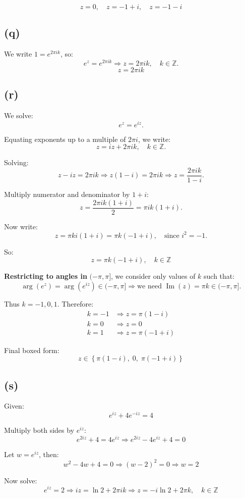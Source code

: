 \documentclass{article}
\begin{document}
\[
\boxed{z = 0,\quad z = -1 + i,\quad z = -1 - i}
\]
\subsection*{(q)}
We write \(1 = e^{2\pi i k}\), so:
\[
e^z = e^{2\pi i k} \Rightarrow z = 2\pi i k, \quad k \in \mathbb{Z}.
\]
\[
\boxed{z = 2\pi i k}
\]
\subsection*{(r)}
We solve:
\[
e^z = e^{iz}.
\]

Equating exponents up to a multiple of \(2\pi i\), we write:
\[
z = iz + 2\pi i k, \quad k \in \mathbb{Z}.
\]

Solving:
\[
z - iz = 2\pi i k
\Rightarrow z(1 - i) = 2\pi i k
\Rightarrow z = \frac{2\pi i k}{1 - i}.
\]

Multiply numerator and denominator by \(1 + i\):
\[
z = \frac{2\pi i k (1 + i)}{2} = \pi i k (1 + i).
\]

Now write:
\[
z = \pi k i (1 + i) = \pi k (-1 + i), \quad \text{since } i^2 = -1.
\]

So:
\[
\boxed{z = \pi k(-1 + i), \quad k \in \mathbb{Z}}
\]

\textbf{Restricting to angles in } \((- \pi, \pi]\), we consider only values of \(k\) such that:
\[
\arg(e^z) = \arg(e^{iz}) \in (-\pi, \pi]
\Rightarrow \text{we need } \operatorname{Im}(z) = \pi k \in (-\pi, \pi].
\]

Thus \(k = -1, 0, 1\). Therefore:
\[
\boxed{
\begin{aligned}
k = -1 &\Rightarrow z = \pi (1 - i) \\
k = 0 &\Rightarrow z = 0 \\
k = 1 &\Rightarrow z = \pi (-1 + i)
\end{aligned}
}
\]

Final boxed form:
\[
\boxed{
z \in \left\{ \pi(1 - i),\; 0,\; \pi(-1 + i) \right\}
}
\]
\subsection*{(s)}
Given:
\[
e^{iz} + 4e^{-iz} = 4
\]

Multiply both sides by \(e^{iz}\):
\[
e^{2iz} + 4 = 4e^{iz}
\Rightarrow e^{2iz} - 4e^{iz} + 4 = 0
\]

Let \(w = e^{iz}\), then:
\[
w^2 - 4w + 4 = 0
\Rightarrow (w - 2)^2 = 0 \Rightarrow w = 2
\]

Now solve:
\[
e^{iz} = 2 \Rightarrow iz = \ln 2 + 2\pi i k
\Rightarrow z = -i \ln 2 + 2\pi k, \quad k \in \mathbb{Z}
\]
\end{document}
